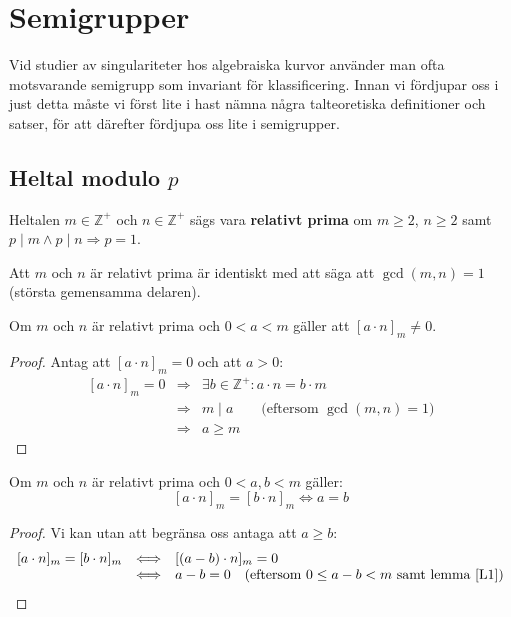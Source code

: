 \chapter{Semigrupper}

Vid studier av singulariteter hos algebraiska kurvor använder man ofta motsvarande semigrupp som invariant för klassificering. Innan vi fördjupar oss i just detta måste vi först lite i hast nämna några talteoretiska definitioner och satser, för att därefter fördjupa oss lite i semigrupper.

\section{Heltal modulo $p$}

\begin{Definition}
Heltalen $m \in \mathbb{Z}^+$ och $n \in \mathbb{Z}^+$ sägs vara \textbf{relativt prima} om $m \geq 2$, $n \geq 2$ samt $p \mid m \wedge p \mid n \Longrightarrow p = 1$.
\end{Definition}

Att $m$ och $n$ är relativt prima är identiskt med att säga att $\gcd(m, n) = 1$
(största gemensamma delaren).

\begin{Lemma}
\label{L1}
Om $m$ och $n$ är relativt prima och $0 < a < m$ gäller att $[a \cdot n]_m \neq 0$.
\end{Lemma}

\begin{proof}
Antag att $[a \cdot n]_m = 0$ och att $a > 0$:
\[\begin{array}{rcl}
[a \cdot n]_m = 0 & \Longrightarrow & \exists b \in \mathbb{Z}^+ : a \cdot n = b \cdot m \\
 & \Longrightarrow & m \mid a \qquad\text{(eftersom }\gcd(m, n) = 1\text{)} \\
 & \Longrightarrow & a \geq m
\end{array}\]
\end{proof}

\begin{Lemma}
\label{L2}
Om $m$ och $n$ är relativt prima och $0 < a, b < m$ gäller:
\[[a \cdot n]_m = [b \cdot n]_m \Longleftrightarrow a = b\]
\end{Lemma}

\begin{proof}
Vi kan utan att begränsa oss antaga att $a \geq b$:
\[\begin{array}{rcl}
[a \cdot n]_m = [b \cdot n]_m & \Longleftrightarrow & [(a - b) \cdot n]_m = 0 \\
 & \Longleftrightarrow & a - b = 0 \quad\text{(eftersom } 0 \leq a - b < m \text{ samt lemma \ref{L1})}
\end{array}\]
\end{proof}

